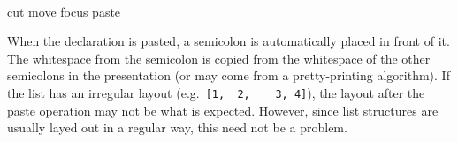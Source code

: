 \documentclass{speauth}
\begin{document}
\begin{center}
\thenn
{}
\thenn
{}
\thenn
{}
\nopagebreak[4]\\ [2mm]
\begin{small}
\parbox{\textwidth}{
{\hspace*{3.75cm} cut \hspace{1.79cm} move focus  \hspace{1.8cm} paste}}
\end{small}\end{center}

When the declaration is pasted, a semicolon is automatically placed in front of it. The whitespace from the semicolon is copied from the whitespace of the other semicolons in the presentation (or may come from a pretty-printing algorithm). If the list has an irregular layout (e.g.\ \verb|[1,  2,    3, 4]|), the layout after the paste operation may not be what is expected. However, since list structures are usually layed out in a regular way, this need not be a problem.
\end{document}
